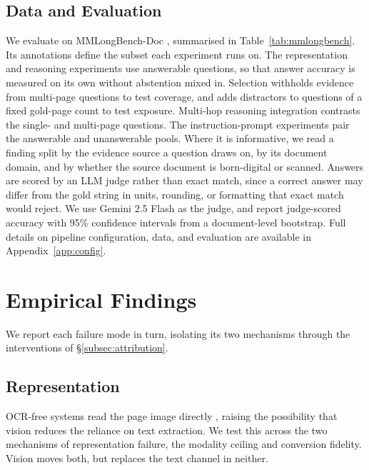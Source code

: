 \documentclass[11pt]{article}
\begin{document}



\subsection{Data and Evaluation}
\label{subsec:data_evaluation}
We evaluate on MMLongBench-Doc \cite{ma2024mmlongbench}, summarised in Table~\ref{tab:mmlongbench}. Its annotations define the subset each experiment runs on. The representation and reasoning experiments use answerable questions, so that answer accuracy is measured on its own without abstention mixed in. Selection withholds evidence from multi-page questions to test coverage, and adds distractors to questions of a fixed gold-page count to test exposure. Multi-hop reasoning integration contrasts the single- and multi-page questions. The instruction-prompt experiments pair the answerable and unanswerable pools. Where it is informative, we read a finding split by the evidence source a question draws on, by its document domain, and by whether the source document is born-digital or scanned.
Answers are scored by an LLM judge rather than exact match, since a correct answer may differ from the gold string in units, rounding, or formatting that exact match would reject. We use Gemini 2.5 Flash as the judge, and report judge-scored accuracy with 95\% confidence intervals from a document-level bootstrap. Full details on pipeline configuration, data, and evaluation are available in Appendix~\ref{app:config}.

\section{Empirical Findings}
We report each failure mode in turn, isolating its two mechanisms through the interventions of \S\ref{subsec:attribution}.


\subsection{Representation}
\label{sec:representation}
OCR-free systems read the page image directly \citep{cho2024m3docrag,tanaka2025vdocrag}, raising the possibility that vision reduces the reliance on text extraction. We test this across the two mechanisms of representation failure, the modality ceiling and conversion fidelity. Vision moves both, but replaces the text channel in neither.
\end{document}
